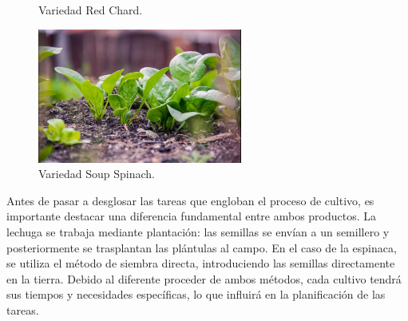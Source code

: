 \begin{figure}[ht!]
\begin{minipage}[b]{0.45\textwidth}
        \caption{Variedad Red Chard.}
        \label{fig:red}
    \end{minipage}
    \begin{minipage}[b]{0.45\textwidth}
        \centering
        \includegraphics[width=0.6\textwidth]{img/soup_spinach.png}
        \caption{Variedad Soup Spinach.}
        \label{fig:soup}
    \end{minipage}
\end{figure}


Antes de pasar a desglosar las tareas que engloban el proceso de cultivo, es importante destacar una diferencia fundamental entre ambos productos.
La lechuga se trabaja mediante plantación: las semillas se envían a un semillero y posteriormente se trasplantan las plántulas al campo. 
En el caso de la espinaca, se utiliza el método de siembra directa, introduciendo las semillas directamente en la tierra.
Debido al diferente proceder de ambos métodos, cada cultivo tendrá sus tiempos y necesidades específicas, lo que influirá en la planificación de las tareas.

